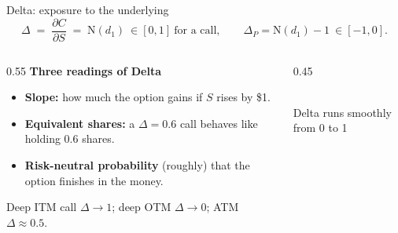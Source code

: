 \documentclass[11pt,aspectratio=169]{beamer}
\newcommand{\Ncdf}{\mathrm{N}}             %
\newcommand{\call}{C}
\newcommand{\putt}{P}
\newcommand{\und}{S}                         %
\begin{document}
\begin{frame}{Delta: exposure to the underlying}
  \[
    \Delta \;=\; \frac{\partial \call}{\partial \und} \;=\; \Ncdf(d_1)\ \in[0,1]\ \text{for a call},\qquad
    \Delta_{\putt}=\Ncdf(d_1)-1\ \in[-1,0].
  \]
  \begin{columns}[c]
    \begin{column}{0.55\textwidth}
      \textbf{Three readings of Delta}
      \begin{itemize}\small
        \item \textbf{Slope:} how much the option gains if $\und$ rises by \$1.
        \item \textbf{Equivalent shares:} a $\Delta=0.6$ call behaves like holding $0.6$ shares.
        \item \textbf{Risk-neutral probability} (roughly) that the option finishes in the money.
      \end{itemize}
      \vspace{0.3em}
      Deep ITM call $\Delta\!\to\!1$; deep OTM $\Delta\!\to\!0$; ATM $\Delta\!\approx\!0.5$.
    \end{column}
    \begin{column}{0.45\textwidth}
      \centering
      \\
      {\tiny\color{muted}Delta runs smoothly from 0 to 1}
    \end{column}
  \end{columns}
\end{frame}
\end{document}

